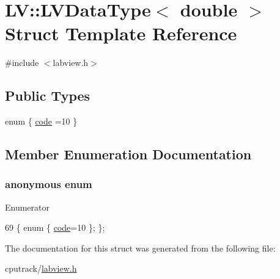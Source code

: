\hypertarget{struct_l_v_1_1_l_v_data_type_3_01double_01_4}{}\section{LV\+:\+:L\+V\+Data\+Type$<$ double $>$ Struct Template Reference}
\label{struct_l_v_1_1_l_v_data_type_3_01double_01_4}


{\ttfamily \#include $<$labview.\+h$>$}

\subsection*{Public Types}
\begin{DoxyCompactItemize}
\item 
enum \{ \hyperlink{struct_l_v_1_1_l_v_data_type_3_01double_01_4_a2f3d18e4276ad321db555878c17cbcc8ab7aa10e201199e90b784b632bc4c7eb1}{code} =10
 \}
\end{DoxyCompactItemize}


\subsection{Member Enumeration Documentation}
\subsubsection[{\texorpdfstring{anonymous enum}{anonymous enum}}]{\setlength{\rightskip}{0pt plus 5cm}anonymous enum}\hypertarget{struct_l_v_1_1_l_v_data_type_3_01double_01_4_a2f3d18e4276ad321db555878c17cbcc8}{}\label{struct_l_v_1_1_l_v_data_type_3_01double_01_4_a2f3d18e4276ad321db555878c17cbcc8}
\begin{Desc}
\item[Enumerator]\par
\begin{description}
\item[{\em 
code\hypertarget{struct_l_v_1_1_l_v_data_type_3_01double_01_4_a2f3d18e4276ad321db555878c17cbcc8ab7aa10e201199e90b784b632bc4c7eb1}{}\label{struct_l_v_1_1_l_v_data_type_3_01double_01_4_a2f3d18e4276ad321db555878c17cbcc8ab7aa10e201199e90b784b632bc4c7eb1}
}]\end{description}
\end{Desc}

\begin{DoxyCode}
69 \{ \textcolor{keyword}{enum} \{ \hyperlink{struct_l_v_1_1_l_v_data_type_3_01double_01_4_a2f3d18e4276ad321db555878c17cbcc8ab7aa10e201199e90b784b632bc4c7eb1}{code}=10 \}; \};
\end{DoxyCode}


The documentation for this struct was generated from the following file\+:\begin{DoxyCompactItemize}
\item 
cputrack/\hyperlink{labview_8h}{labview.\+h}\end{DoxyCompactItemize}

